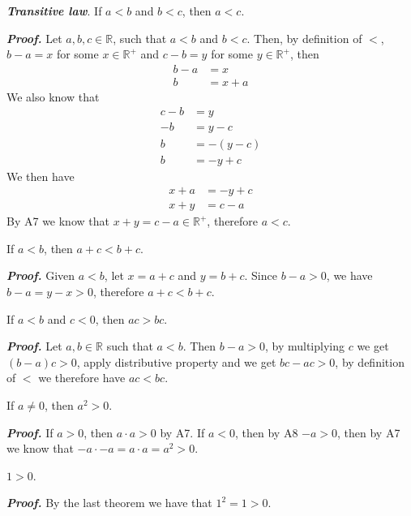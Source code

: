 \documentclass{report}
\begin{document}
    \begin{thBox}
        \textit{\textbf{Transitive law}}. If $a<b$ and $b<c$, then $a<c$.
    \end{thBox}

    \textit{\textbf{Proof.}} Let $a,b,c \in \mathbb{R}$, such that $a<b$ and $b<c$. Then, by definition of $<$, $b-a = x$ for some $x\in \mathbb{R}^+$ and $c-b=y$ for some $y \in \mathbb{R}^+$, then
    \begin{align*}
        b-a &= x\\
        b &= x+a
    \end{align*}
    We also know that
    \begin{align*}
        c-b &= y\\
        -b &= y-c\\
        b &= -(y-c)\\
        b &= -y + c
    \end{align*}
    We then have
    \begin{align*}
        x+a &= -y+c\\
        x+y &= c-a
    \end{align*}
    By A7 we know that $x+y = c-a \in \mathbb{R}^+$, therefore $a<c$.\\

    \begin{thBox}
        If $a<b$, then $a+c<b+c$.
    \end{thBox}
    \textbf{\textit{Proof.}} Given \(a < b\), let \(x = a + c\) and \(y = b + c\). Since \(b - a > 0\), we have \(b - a = y - x > 0\), therefore $a+c < b+c$.\\

    \begin{thBox}
        If $a<b$ and $c<0$, then $ac>bc$.
    \end{thBox}
    \textit{\textbf{Proof.}} Let $a,b \in \mathbb{R}$ such that $a<b$. Then $b-a>0$, by multiplying $c$ we get $(b-a)c > 0$, apply distributive property and we get $bc-ac >0$, by definition of $<$ we therefore have $ac<bc$.\\

    \begin{thBox}
        If $a \not = 0$, then $a^2 > 0$.
    \end{thBox}
    \textit{\textbf{Proof.}} If $a>0$, then $a \cdot a > 0$ by A7. If $a<0$, then by A8 $-a >0$, then by A7 we know that $-a \cdot -a = a \cdot a = a^2 > 0$.\\

    \begin{thBox}
        $1 > 0$.
    \end{thBox}
    \textit{\textbf{Proof.}} By the last theorem we have that $1^2 = 1 >0$.\\
\end{document}
